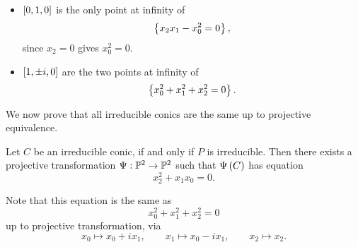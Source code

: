 \begin{example}
\hfill
\begin{itemize}
\item $ \sb{0, 1, 0} $ is the only point at infinity of
$$ \cb{x_2x_1 - x_0^2 = 0}, $$
since $ x_2 = 0 $ gives $ x_0^2 = 0 $.
\item $ \sb{1, \pm i, 0} $ are the two points at infinity of
$$ \cb{x_0^2 + x_1^2 + x_2^2 = 0}. $$
\end{itemize}
\end{example}

We now prove that all irreducible conics are the same up to projective equivalence.

\begin{theorem}
\label{thm:10.2}
Let $ C $ be an irreducible conic, if and only if $ P $ is irreducible. Then there exists a projective transformation $ \Psi : \P^2 \to \P^2 $ such that $ \Psi\rb{C} $ has equation
$$ x_2^2 + x_1x_0 = 0. $$
\end{theorem}

\begin{remark}
Note that this equation is the same as
$$ x_0^2 + x_1^2 + x_2^2 = 0 $$
up to projective transformation, via
$$ x_0 \mapsto x_0 + ix_1, \qquad x_1 \mapsto x_0 - ix_1, \qquad x_2 \mapsto x_2. $$
\end{remark}

